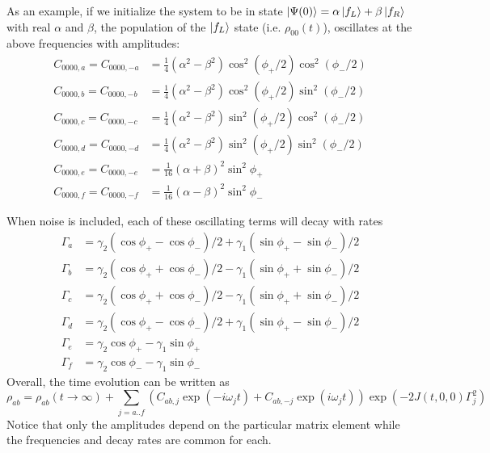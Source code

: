 As an example, if we initialize the system to be in state $\ket{\Psi(0)} = \alpha\ket{f_L} + \beta\ket{f_R}$ with real $\alpha$ and $\beta$, the population of the $\ket{f_L}$ state (i.e. $\rho_{00}(t)$), oscillates at the above frequencies with amplitudes:
\begin{subequations}
    \begin{align}
        C_{0000,a}=C_{0000,-a} & = \frac{1}{4}(\alpha^2-\beta^2)\cos^2(\phi_+/2)\cos^2(\phi_-/2) \\
        C_{0000,b}=C_{0000,-b} & = \frac{1}{4}(\alpha^2-\beta^2)\cos^2(\phi_+/2)\sin^2(\phi_-/2) \\
        C_{0000,c}=C_{0000,-c} & = \frac{1}{4}(\alpha^2-\beta^2)\sin^2(\phi_+/2)\cos^2(\phi_-/2) \\
        C_{0000,d}=C_{0000,-d} & = \frac{1}{4}(\alpha^2-\beta^2)\sin^2(\phi_+/2)\sin^2(\phi_-/2) \\
        C_{0000,e}=C_{0000,-e} & = \frac{1}{16}(\alpha+\beta)^2\sin^2\phi_+                      \\
        C_{0000,f}=C_{0000,-f} & = \frac{1}{16}(\alpha-\beta)^2\sin^2\phi_-
    \end{align}
\end{subequations}

When noise is included, each of these oscillating terms will decay with rates
\begin{subequations}
    \begin{align}
        \Gamma_a & = \gamma_2(\cos\phi_+ - \cos\phi_-)/2 + \gamma_1(\sin\phi_+-\sin\phi_-)/2 \\
        \Gamma_b & = \gamma_2(\cos\phi_+ + \cos\phi_-)/2 - \gamma_1(\sin\phi_++\sin\phi_-)/2 \\
        \Gamma_c & = \gamma_2(\cos\phi_+ + \cos\phi_-)/2 - \gamma_1(\sin\phi_++\sin\phi_-)/2 \\
        \Gamma_d & = \gamma_2(\cos\phi_+ - \cos\phi_-)/2 + \gamma_1(\sin\phi_+-\sin\phi_-)/2 \\
        \Gamma_e & = \gamma_2\cos\phi_+-\gamma_1\sin\phi_+                                   \\
        \Gamma_f & = \gamma_2\cos\phi_--\gamma_1\sin\phi_-
    \end{align}
\end{subequations}
Overall, the time evolution can be written as
\begin{equation}
    \rho_{ab} = \rho_{ab}(t\rightarrow\infty) + \sum_{j={a..f}}\left(C_{ab,j}\exp(-i\omega_jt)+C_{ab,-j}\exp(i\omega_jt)\right)\exp(-2J(t,0,0)\Gamma_j^2)
\end{equation}
Notice that only the amplitudes depend on the particular matrix element while the frequencies and decay rates are common for each.

